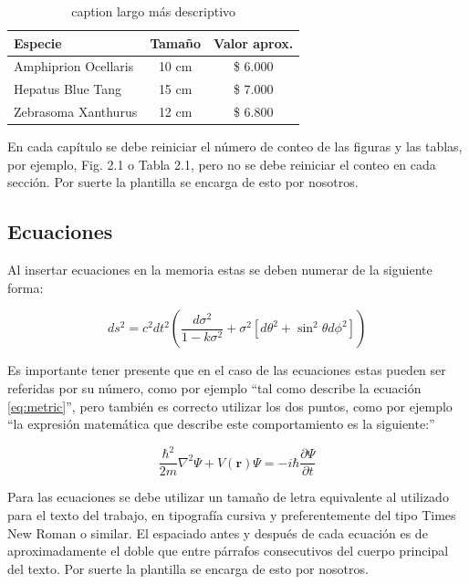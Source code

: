 \begin{table}[h]
	\centering
	\caption[caption corto]{caption largo más descriptivo}
	\begin{tabular}{l c c}    
		\toprule
		\textbf{Especie} 	 & \textbf{Tamaño}  & \textbf{Valor aprox.}  \\
		\midrule
		Amphiprion Ocellaris	 & 10 cm 			& \$ 6.000 \\		
		Hepatus Blue Tang	 & 15 cm				& \$ 7.000 \\
		Zebrasoma Xanthurus	 & 12 cm				& \$ 6.800 \\
		\bottomrule
		\hline
	\end{tabular}
	\label{tab:peces}
\end{table}

En cada capítulo se debe reiniciar el número de conteo de las figuras y las tablas, por ejemplo, Fig. 2.1 o Tabla 2.1, pero no se debe reiniciar el conteo en cada sección. Por suerte la plantilla se encarga de esto por nosotros.

\subsection{Ecuaciones}
\label{sec:Ecuaciones}

Al insertar ecuaciones en la memoria estas se deben numerar de la siguiente forma:

\begin{equation}
	\label{eq:metric}
	ds^2 = c^2 dt^2 \left( \frac{d\sigma^2}{1-k\sigma^2} + \sigma^2\left[ d\theta^2 + \sin^2\theta d\phi^2 \right] \right)
\end{equation}
                                                        
Es importante tener presente que en el caso de las ecuaciones estas pueden ser referidas por su número, como por ejemplo ``tal como describe la ecuación \ref{eq:metric}'', pero también es correcto utilizar los dos puntos, como por ejemplo ``la expresión matemática que describe este comportamiento es la siguiente:''

\begin{equation}
	\label{eq:schrodinger}
	\frac{\hbar^2}{2m}\nabla^2\Psi + V(\mathbf{r})\Psi = -i\hbar \frac{\partial\Psi}{\partial t}
\end{equation}

Para las ecuaciones se debe utilizar un tamaño de letra equivalente al utilizado para el texto del trabajo, en tipografía cursiva y preferentemente del tipo Times New Roman o similar. El espaciado antes y después de cada ecuación es de aproximadamente el doble que entre párrafos consecutivos del cuerpo principal del texto. Por suerte la plantilla se encarga de esto por nosotros.

